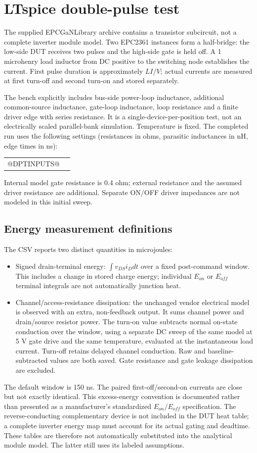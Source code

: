 \clearpage
\section{LTspice double-pulse test}
The supplied EPCGaNLibrary archive contains a transistor subcircuit, not a
complete inverter module model. Two EPC2361 instances form a half-bridge:
the low-side DUT receives two pulses and the high-side gate is held off.
A 1 microhenry load inductor from DC positive to the switching node establishes
the current. First pulse duration is approximately $LI/V$; actual currents are
measured at first turn-off and second turn-on and stored separately.

The bench explicitly includes bus-side power-loop inductance, additional
common-source inductance, gate-loop inductance, loop resistance and a finite
driver edge with series resistance. It is a single-device-per-position test,
not an electrically scaled parallel-bank simulation. Temperature is fixed.
The completed run uses the following settings (resistances in ohms, parasitic
inductances in nH, edge times in ns):
\begin{center}\small\begin{tabular}{ll}
@DPTINPUTS@
\end{tabular}\end{center}
Internal model gate resistance is 0.4 ohm; external resistance and the assumed
driver resistance are additional. Separate ON/OFF driver impedances are not
modeled in this initial sweep.
\subsection{Energy measurement definitions}
The CSV reports two distinct quantities in microjoules:
\begin{itemize}
\item Signed drain-terminal energy: $\int v_{DS}i_Ddt$ over a fixed post-command
window. This includes a change in stored charge energy; individual $E_{on}$
or $E_{off}$ terminal integrals are not automatically junction heat.
\item Channel/access-resistance dissipation: the unchanged vendor electrical
model is observed with an extra, non-feedback output. It sums channel power
and drain/source resistor power. The turn-on value subtracts normal on-state
conduction over the window, using a separate DC sweep of the same model at
5 V gate drive and the same temperature, evaluated at the instantaneous load current.
Turn-off retains delayed channel conduction. Raw and baseline-subtracted values
are both saved. Gate resistance and gate leakage dissipation are excluded.
\end{itemize}
The default window is 150 ns. The paired first-off/second-on currents are close
but not exactly identical. This excess-energy convention is documented rather
than presented as a manufacturer's standardized $E_{on}/E_{off}$ specification.
The reverse-conducting complementary device is not included in the DUT heat
table; a complete inverter energy map must account for its actual gating and
deadtime. These tables are therefore not automatically substituted into the
analytical module model. The latter still uses its labeled assumptions.

